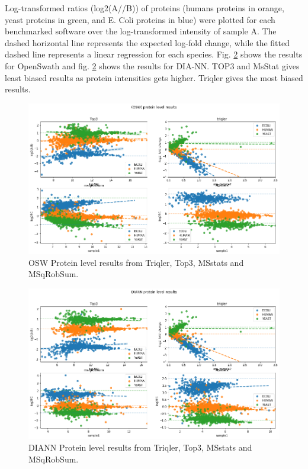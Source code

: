 \documentclass[10pt,letterpaper]{article}
\begin{document}
Log-transformed ratios (log2(A//B)) of proteins (humans proteins in orange, yeast proteins in green, and E. Coli proteins in blue) were plotted for each benchmarked software over the log-transformed intensity of sample A. The dashed horizontal line represents the expected log-fold change, while the fitted dashed line represents a linear regression for each species. Fig. \ref{fig:OSW_scatter} shows the results for OpenSwath and fig. \ref{fig:OSW_scatter} shows the results for DIA-NN. TOP3 and MsStat gives least biased results as protein intensities gets higher. Triqler gives the most biased results. 

\begin{figure}[H]
    \centering
    \includegraphics[width=16cm]{../../result/2021-08-13_docs_plots/OSW_protein_level_benchmark_scatter.png}
    \caption{OSW Protein level results from Triqler, Top3, MSstats and MSqRobSum.}
    \label{fig:OSW_scatter}
\end{figure}

\begin{figure}[H]
    \centering
    \includegraphics[width=16cm]{../../result/2021-08-13_docs_plots/DIANN_protein_level_benchmark_scatter.png}
    \caption{DIANN Protein level results from Triqler, Top3, MSstats and MSqRobSum.}
    \label{fig:OSW_scatter}
\end{figure}
\end{document}
